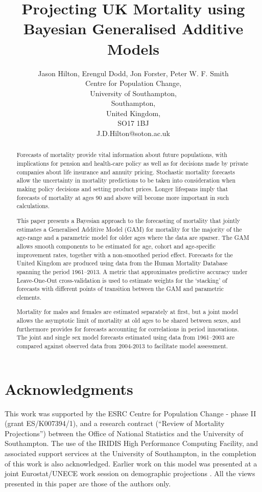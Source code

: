 \documentclass[10pt,a4paper]{article}
\title{Projecting UK Mortality using Bayesian Generalised Additive Models}
\author{Jason Hilton, Erengul Dodd, Jon Forster, Peter W. F. Smith\\
Centre for Population Change,\\
University of Southampton,\\
Southampton,\\
United Kingdom,\\
SO17 1BJ \\
J.D.Hilton@soton.ac.uk
}
\begin{document}
\maketitle
\begin{abstract}
Forecasts of mortality provide vital information about future populations, with implications for  pension and health-care policy as well as for decisions made by private companies about life insurance and annuity pricing. Stochastic mortality forecasts allow the uncertainty in mortality predictions to be taken into consideration when making policy decisions and setting product prices. Longer lifespans imply that forecasts of mortality at ages 90 and above will become more important in such calculations.

This paper presents a Bayesian approach to the forecasting of mortality that jointly estimates a Generalised Additive Model (GAM) for mortality for the majority of the age-range and a parametric model for older ages where the data are sparser. The GAM allows smooth components to be estimated for age, cohort and age-specific improvement rates, together with a non-smoothed period effect.  Forecasts for the United Kingdom are produced using data from the Human Mortality Database spanning the period 1961--2013. A metric that approximates predictive accuracy under Leave-One-Out cross-validation is used to estimate weights for the `stacking' of forecasts with different points of transition between the GAM and parametric elements.

Mortality for males and females are estimated separately at first, but a joint model allows the asymptotic limit of mortality at old ages to be shared between sexes, and furthermore provides for forecasts accounting for correlations in period innovations. The joint and single sex model forecasts estimated using data from 1961--2003 are compared against observed data from 2004-2013 to facilitate model assessment.
\end{abstract}

\section*{Acknowledgments}\label{acknowledgments}

This work was supported by the ESRC Centre for Population Change - phase II (grant ES/K007394/1), and a research contract (“Review of Mortality Projections”) between the Office of National Statistics and the University of Southampton. The use of the IRIDIS High Performance Computing Facility, and associated support services at the University of Southampton, in the completion of this work is also acknowledged. Earlier work on this model was presented at a joint Eurostat/UNECE work session on demographic projections \citep{Forster2016}. All the views presented in this paper are those of the authors only.






\end{document}
